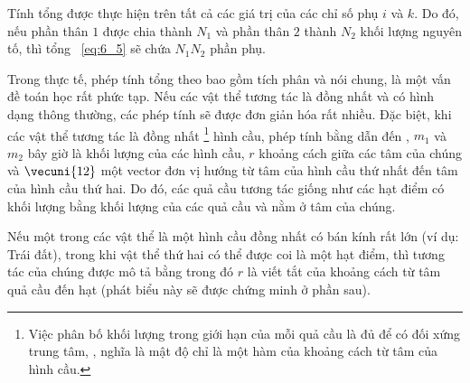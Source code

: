 \noindent
Tính tổng được thực hiện trên tất cả các giá trị của các chỉ số phụ $i$ và $k$. Do đó, nếu phần thân $1$ được chia thành $N_1$ và phần thân $2$ thành $N_2$ khối lượng nguyên tố, thì tổng ~\eqref{eq:6_5} sẽ chứa $N_1N_2$ phần phụ.

Trong thực tế, phép tính tổng theo  bao gồm tích phân và nói chung, là một vấn đề toán học rất phức tạp. Nếu các vật thể tương tác là đồng nhất và có hình dạng thông thường, các phép tính sẽ được đơn giản hóa rất nhiều. Đặc biệt, khi các vật thể tương tác là đồng nhất \footnote{Việc phân bố khối lượng trong giới hạn của mỗi quả cầu là đủ để có đối xứng trung tâm, \ie, nghĩa là mật độ chỉ là một hàm của khoảng cách từ tâm của hình cầu.} hình cầu, phép tính bằng  dẫn đến , $m_1$ và $m_2$ bây giờ là khối lượng của các hình cầu, $r$ khoảng cách giữa các tâm của chúng và $\vecuni{12}$ một vector đơn vị hướng từ tâm của hình cầu thứ nhất đến tâm của hình cầu thứ hai. Do đó, các quả cầu tương tác giống như các hạt điểm có khối lượng bằng khối lượng của các quả cầu và nằm ở tâm của chúng.

Nếu một trong các vật thể là một hình cầu đồng nhất có bán kính rất lớn (ví dụ: Trái đất), trong khi vật thể thứ hai có thể được coi là một hạt điểm, thì tương tác của chúng được mô tả bằng  trong đó $r$ là viết tắt của khoảng cách từ tâm quả cầu đến hạt (phát biểu này sẽ được chứng minh ở phần sau).

